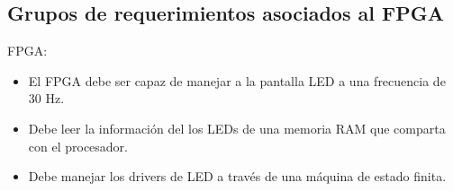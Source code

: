 \subsection{Grupos de requerimientos asociados al FPGA}
FPGA:
\begin{itemize}
\item El FPGA debe ser capaz de manejar a la pantalla LED a una frecuencia de  30 Hz.
\item Debe leer la información del los LEDs de una memoria RAM que comparta con el procesador.
\item Debe manejar los drivers de LED a través de una máquina de estado finita.   
\end{itemize}